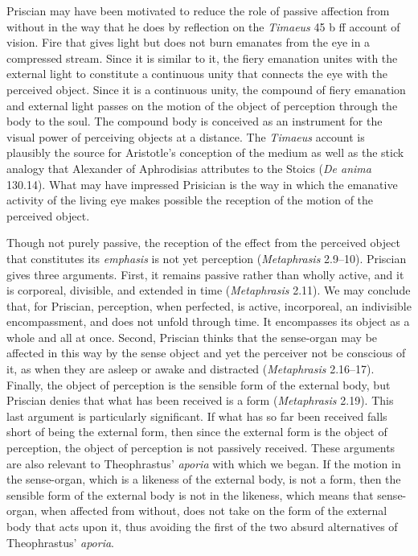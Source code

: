 \documentclass[12pt]{article}
\begin{document}
Priscian may have been motivated to reduce the role of passive affection from without in the way that he does by reflection on the \emph{Timaeus} 45 b ff account of vision. Fire that gives light but does not burn emanates from the eye in a compressed stream. Since it is similar to it, the fiery emanation unites with the external light to constitute a continuous unity that connects the eye with the perceived object. Since it is a continuous unity, the compound of fiery emanation and external light passes on the motion of the object of perception through the body to the soul. The compound body is conceived as an instrument for the visual power of perceiving objects at a distance. The \emph{Timaeus} account is plausibly the source for Aristotle's conception of the medium as well as the stick analogy that Alexander of Aphrodisias attributes to the Stoics (\emph{De anima} 130.14). What may have impressed Prisician is the way in which the emanative activity of the living eye makes possible the reception of the motion of the perceived object.

Though not purely passive, the reception of the effect from the perceived object that constitutes its \emph{emphasis} is not yet perception (\emph{Metaphrasis} 2.9--10). Priscian gives three arguments. First, it remains passive rather than wholly active, and it is corporeal, divisible, and extended in time (\emph{Metaphrasis} 2.11). We may conclude that, for Priscian, perception, when perfected, is active, incorporeal, an indivisible encompassment, and does not unfold through time. It encompasses its object as a whole and all at once. Second, Priscian thinks that the sense-organ may be affected in this way by the sense object and yet the perceiver not be conscious of it, as when they are asleep or awake and distracted (\emph{Metaphrasis} 2.16--17). Finally, the object of perception is the sensible form of the external body, but Priscian denies that what has been received is a form (\emph{Metaphrasis} 2.19). This last argument is particularly significant. If what has so far been received falls short of being the external form, then since the external form is the object of perception, the object of perception is not passively received. These arguments are also relevant to Theophrastus' \emph{aporia} with which we began. If the motion in the sense-organ, which is a likeness of the external body, is not a form, then the sensible form of the external body is not in the likeness, which means that sense-organ, when affected from without, does not take on the form of the external body that acts upon it, thus avoiding the first of the two absurd alternatives of Theophrastus' \emph{aporia}. 
\end{document}
